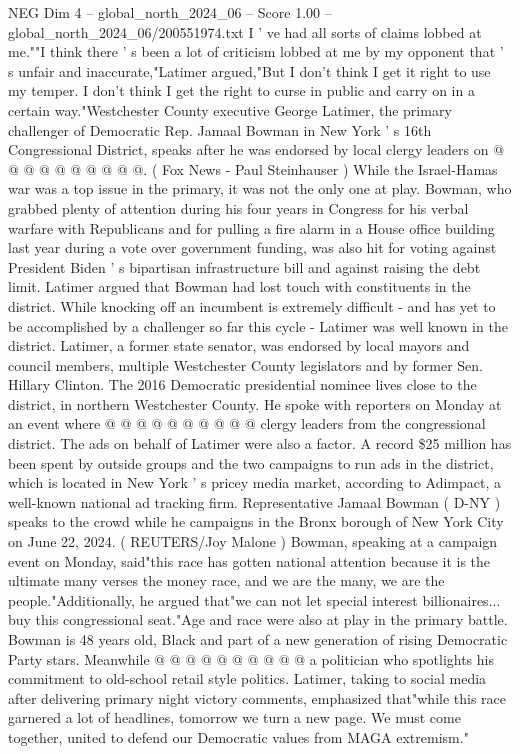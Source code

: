 \begin{textsample}{NEG Dim 4 – global\_north\_2024\_06 – Score 1.00 – global\_north\_2024\_06/200551974.txt}
I ' ve had all sorts of claims lobbed at me.""I think there ' s been a lot of criticism lobbed at me by my opponent that ' s unfair and inaccurate,"Latimer argued,"But I don't think I get it right to use my temper.
I don't think I get the right to curse in public and carry on in a certain way."Westchester County executive George Latimer, the primary challenger of Democratic Rep.
Jamaal Bowman in New York ' s 16th Congressional District, speaks after he was endorsed by local clergy leaders on @ @ @ @ @ @ @ @ @ @. ( Fox News - Paul Steinhauser ) While the Israel-Hamas war was a top issue in the primary, it was not the only one at play.
Bowman, who grabbed plenty of attention during his four years in Congress for his verbal warfare with Republicans and for pulling a fire alarm in a House office building last year during a vote over government funding, was also hit for voting against President Biden ' s bipartisan infrastructure bill and against raising the debt limit.
Latimer argued that Bowman had lost touch with constituents in the district.
While knocking off an incumbent is extremely difficult - and has yet to be accomplished by a challenger so far this cycle - Latimer was well known in the district.
Latimer, a former state senator, was endorsed by local mayors and council members, multiple Westchester County legislators and by former Sen.
Hillary Clinton.
The 2016 Democratic presidential nominee lives close to the district, in northern Westchester County.
He spoke with reporters on Monday at an event where @ @ @ @ @ @ @ @ @ @ clergy leaders from the congressional district.
The ads on behalf of Latimer were also a factor.
A record \$25 million has been spent by outside groups and the two campaigns to run ads in the district, which is located in New York ' s pricey media market, according to Adimpact, a well-known national ad tracking firm.
Representative Jamaal Bowman ( D-NY ) speaks to the crowd while he campaigns in the Bronx borough of New York City on June 22, 2024. ( REUTERS/Joy Malone ) Bowman, speaking at a campaign event on Monday, said"this race has gotten national attention because it is the ultimate many verses the money race, and we are the many, we are the people."Additionally, he argued that"we can not let special interest billionaires... buy this congressional seat."Age and race were also at play in the primary battle.
Bowman is 48 years old, Black and part of a new generation of rising Democratic Party stars.
Meanwhile @ @ @ @ @ @ @ @ @ @ a politician who spotlights his commitment to old-school retail style politics.
Latimer, taking to social media after delivering primary night victory comments, emphasized that"while this race garnered a lot of headlines, tomorrow we turn a new page.
We must come together, united to defend our Democratic values from MAGA extremism."

\end{textsample}
